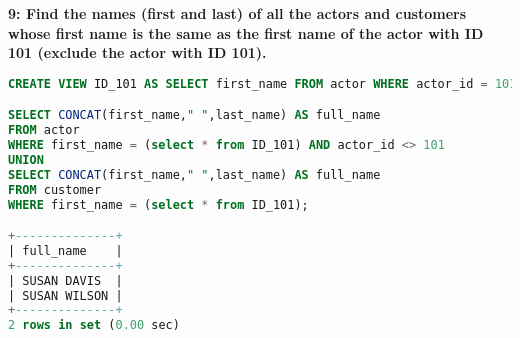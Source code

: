 \documentclass[12pt]{article}
\begin{document}
\textbf{9: Find the names (first and last) of all the actors and customers whose first name is the same as the first name of the actor with ID 101 (exclude the actor with ID 101).}
\begin{lstlisting}[language=SQL]
CREATE VIEW ID_101 AS SELECT first_name FROM actor WHERE actor_id = 101;

SELECT CONCAT(first_name," ",last_name) AS full_name 
FROM actor 
WHERE first_name = (select * from ID_101) AND actor_id <> 101
UNION
SELECT CONCAT(first_name," ",last_name) AS full_name
FROM customer
WHERE first_name = (select * from ID_101);

+--------------+
| full_name    |
+--------------+
| SUSAN DAVIS  |
| SUSAN WILSON |
+--------------+
2 rows in set (0.00 sec)
\end{lstlisting}

\end{document}
